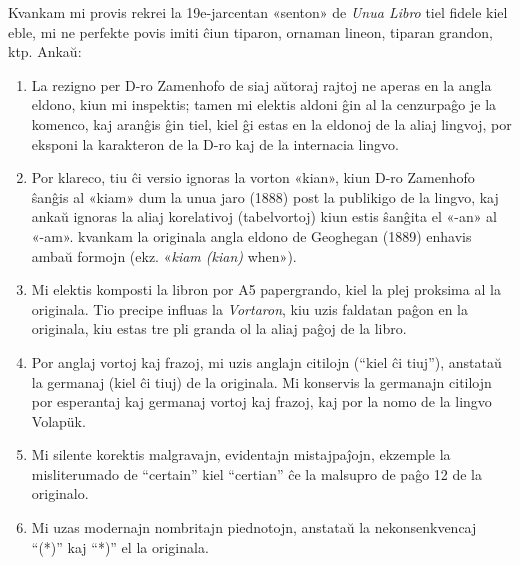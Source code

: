 \documentclass[12pt,twoside]{book}
\begin{document}
\sloppy

%
%


%
%


%
%




%
%


\sectionline

%
%


%
%


%
%


\sectionline

%
%


%
%
\kolofono

\small Kvankam mi provis rekrei la 19e-jarcentan «senton» de \emph{Unua Libro} tiel fidele kiel eble, mi ne perfekte povis imiti ĉiun tiparon, ornaman lineon, tiparan grandon, ktp.  Ankaŭ:

\begin{enumerate}

\item La rezigno per D-ro Zamenhofo de siaj aŭtoraj rajtoj ne aperas en la angla eldono, kiun mi inspektis; tamen mi elektis aldoni ĝin al la cenzurpaĝo je la komenco, kaj aranĝis ĝin tiel, kiel ĝi estas en la eldonoj de la aliaj lingvoj, por eksponi la karakteron de la D-ro kaj de la internacia lingvo.

\item Por klareco, tiu ĉi versio ignoras la vorton «kian», kiun D-ro Zamenhofo ŝanĝis al «kiam» dum la unua jaro (1888) post la publikigo de la lingvo, kaj ankaŭ ignoras la aliaj korelativoj (tabelvortoj) kiun estis ŝanĝita el «-an» al «-am». kvankam la originala angla eldono de Geoghegan (1889) enhavis ambaŭ formojn (ekz. «\emph{kiam (kian)} when»).

\item Mi elektis komposti la libron por A5 papergrando, kiel la plej proksima al la originala.  Tio precipe influas la \emph{Vortaron}, kiu uzis faldatan paĝon en la originala, kiu estas tre pli granda ol la aliaj paĝoj de la libro.

\item Por anglaj vortoj kaj frazoj, mi uzis anglajn citilojn (``kiel ĉi tiuj''), anstataŭ la germanaj (\glqq{}kiel ĉi tiuj\grqq{}) de la originala.  Mi konservis la germanajn citilojn por esperantaj kaj germanaj vortoj kaj frazoj, kaj por la nomo de la lingvo Volap\"{u}k.

\item Mi silente korektis malgravajn, evidentajn mistajpaĵojn, ekzemple la misliterumado de ``certain'' kiel ``certian'' ĉe la malsupro de paĝo 12 de la originalo.

\item Mi uzas modernajn nombritajn piednotojn, anstataŭ la nekonsenkvencaj ``(*)'' kaj ``*)'' el la originala.

\end{enumerate}
\end{document}

